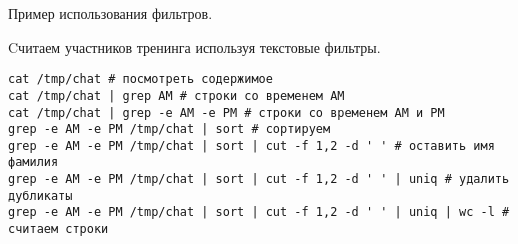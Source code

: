 \begin{frame}[fragile]{Пример использования фильтров.}
  \begin{block}{Cчитаем участников тренинга используя текстовые фильтры.}
\begin{lstlisting}
cat /tmp/chat # посмотреть содержимое
cat /tmp/chat | grep AM # строки со временем AM
cat /tmp/chat | grep -e AM -e PM # строки со временем AM и PM
grep -e AM -e PM /tmp/chat | sort # сортируем
grep -e AM -e PM /tmp/chat | sort | cut -f 1,2 -d ' ' # оставить имя фамилия
grep -e AM -e PM /tmp/chat | sort | cut -f 1,2 -d ' ' | uniq # удалить дубликаты
grep -e AM -e PM /tmp/chat | sort | cut -f 1,2 -d ' ' | uniq | wc -l # считаем строки 
\end{lstlisting}
  \end{block} 
\end{frame}
